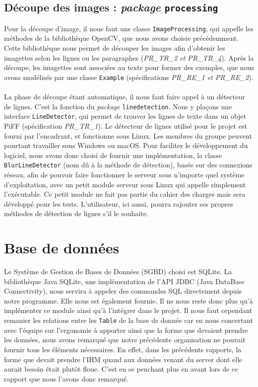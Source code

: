 \subsection{Découpe des images : \textit{package} \texttt{processing}}

Pour la découpe d'image, il nous faut une classe \texttt{ImageProcessing}, qui appelle les méthodes de la bibliothèque OpenCV, que nous avons choisie précédemment. Cette bibliothèque nous permet de découper les images afin d'obtenir les imagettes selon les lignes ou les paragraphes (\textit{PR\_TR\_2 et PR\_TR\_4}). Après la découpe, les imagettes sont associées au texte pour former des exemples, que nous avons modélisés par une classe \texttt{Example} (spécifications \textit{PR\_RE\_1 et PR\_RE\_2}). 

\paragraph{}
La phase de découpe étant automatique, il nous faut faire appel à un détecteur de lignes. C'est la fonction du \textit{package} \texttt{linedetection}. Nous y plaçons une interface \texttt{LineDetector}, qui permet de trouver les lignes de texte dans un objet PiFF (spécification \textit{PR\_TR\_1}). Le détecteur de lignes utilisé pour le projet est fourni par l'encadrant, et fonctionne sous Linux. Les membres du groupe peuvent pourtant travailler sous Windows ou macOS. Pour faciliter le développement du logiciel, nous avons donc choisi de fournir une implémentation, la classe \texttt{BlurLineDetector} (nom dû à la méthode de détection), basée sur des connexions réseau, afin de pouvoir faire fonctionner le serveur sous n'importe quel système d'exploitation, avec un petit module serveur sous Linux qui appelle simplement l'exécutable. Ce petit module ne fait pas partie du cahier des charges mais sera développé pour les tests. L'utilisateur, ici aussi, pourra rajouter ses propres méthodes de détection de lignes s'il le souhaite.

\section{Base de données}

Le Système de Gestion de Bases de Données (SGBD) choisi est SQLite. La bibliothèque Java SQLite, une implémentation de l'API JDBC (Java DataBase Connectivity), nous servira à appeler des commandes SQL directement depuis notre programme. Elle nous est également fournie. Il ne nous reste donc plus qu'à implémenter ce module ainsi qu'à l'intégrer dans le projet.
Il nous faut cependant remanier les relations entre les \texttt{Table} de la base de donnée car en nous concertant avec l'équipe sur l'ergonomie à apporter ainsi que la forme que devaient prendre les données, nous avons remarqué que notre précédente organisation ne pouvait fournir tous les éléments nécessaires. En effet, dans les précédents rapports, la forme que devait prendre l'IHM quand aux données venant du server dont elle aurait besoin était plutôt floue. C'est en se penchant plus en avant lors de ce rapport que nous l'avons donc remarqué.

